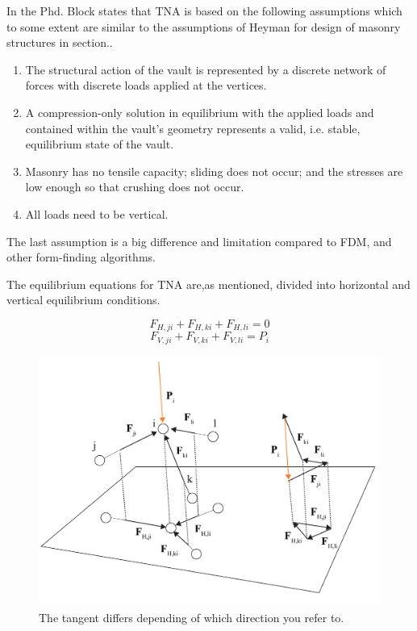 In the Phd. Block states that TNA is based on the following assumptions which to some extent are similar to the assumptions of Heyman for design of masonry structures in section..

\begin{enumerate}
\item The structural action of the vault is represented by a discrete network of forces with discrete loads applied at the vertices. 
\item A compression-only solution in equilibrium with the applied loads and contained within the vault’s geometry represents a valid, i.e. stable, equilibrium state of the vault.
\item Masonry has no tensile capacity; sliding does not occur; and the stresses are low enough so that crushing does not occur. 
\item All loads need to be vertical.
\end{enumerate}

The last assumption is a big difference and limitation compared to FDM, and other form-finding algorithms.


The equilibrium equations for TNA are,as mentioned, divided into  horizontal and vertical equilibrium conditions. 

\begin{equation}
    F_{H,ji} + F_{H,ki}+ F_{H,li}  =0 
\end{equation}
\begin{equation} \label{eq:vertTNA}
    F_{V,ji} + F_{V,ki}+ F_{V,li} = P_i
\end{equation}


\begin{figure}[H]
\centering
\includegraphics[width=0.9\linewidth ]{figure/Theory/NodeEqTNA.pdf}
\caption{The tangent differs depending of which direction you refer to. }
\end{figure}

